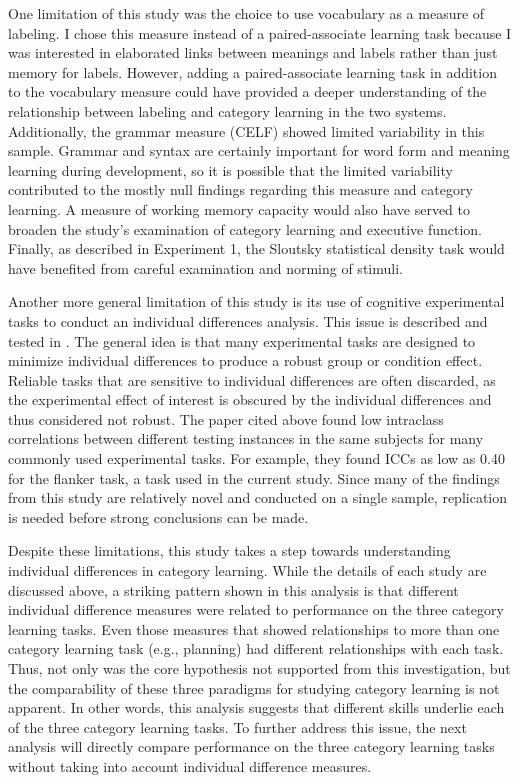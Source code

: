 \documentclass[../dissertation.tex]{subfiles}
\begin{document}
	One limitation of this study was the choice to use vocabulary as a measure of labeling. I chose this measure instead of a paired-associate learning task because I was interested in elaborated links between meanings and labels rather than just memory for labels. However, adding a paired-associate learning task in addition to the vocabulary measure could have provided a deeper understanding of the relationship between labeling and category learning in the two systems. Additionally, the grammar measure (CELF) showed limited variability in this sample. Grammar and syntax are certainly important for word form and meaning learning during development, so it is possible that the limited variability contributed to the mostly null findings regarding this measure and category learning. A measure of working memory capacity would also have served to broaden the study's examination of category learning and executive function. Finally, as described in Experiment 1, the Sloutsky statistical density task would have benefited from careful examination and norming of stimuli. \par
	Another more general limitation of this study is its use of cognitive experimental tasks to conduct an individual differences analysis. This issue is described and tested in \citet{Hedge2018}. The general idea is that many experimental tasks are designed to minimize individual differences to produce a robust group or condition effect. Reliable tasks that are sensitive to individual differences are often discarded, as the experimental effect of interest is obscured by the individual differences and thus considered not robust. The paper cited above found low intraclass correlations between different testing instances in the same subjects for many commonly used experimental tasks. For example, they found ICCs as low as 0.40 for the flanker task, a task used in the current study. Since many of the findings from this study are relatively novel and conducted on a single sample, replication is needed before strong conclusions can be made. \par
	Despite these limitations, this study takes a step towards understanding individual differences in category learning. While the details of each study are discussed above, a striking pattern shown in this analysis is that different individual difference measures were related to performance on the three category learning tasks. Even those measures that showed relationships to more than one category learning task (e.g., planning) had different relationships with each task. Thus, not only was the core hypothesis not supported from this investigation, but the comparability of these three paradigms for studying category learning is not apparent. In other words, this analysis suggests that different skills underlie each of the three category learning tasks. To further address this issue, the next analysis will directly compare performance on the three category learning tasks without taking into account individual difference measures.
	 
\end{document}
